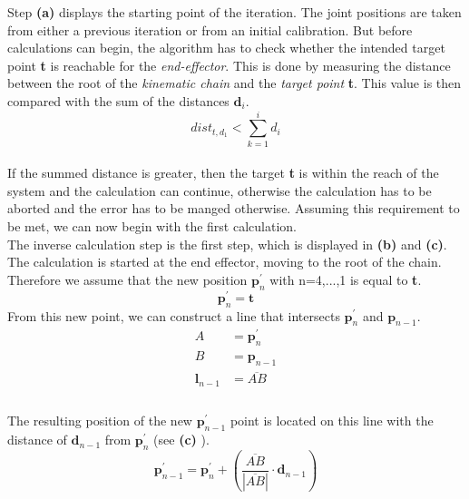 Step \textbf{(a)} displays the starting point of the iteration. The joint positions are taken from either a previous iteration or from an initial calibration. 
But before calculations can begin, the algorithm has to check whether the intended target point \textbf{t} is reachable for the \textit{end-effector}. This is done by measuring the distance between the root of the \textit{kinematic chain} and the \textit{target point} \textbf{t}. This value is then compared with the sum of the distances $\textbf{d}_{i}$.\\
\begin{equation}
 dist_{t,d_{1}}< \sum_{k=1}^{i}{d_{i}}
\end{equation}
\\If the summed distance is greater, then the target \textbf{t} is within the reach of the system and the calculation can continue, otherwise the calculation has to be aborted and the error has to be manged otherwise.
Assuming this requirement to be met, we can now begin with the first calculation. \\The inverse calculation step is the first step, which is displayed in \textbf{(b)} and \textbf{(c)}. The calculation is started at the end effector, moving to the root of the chain.\newpage
Therefore we assume that the new position $\textbf{p}_{n}^{'}$ with n=4,...,1 is equal to \textbf{t}.\\
\begin{equation}
 \textbf{p}_{n}^{'}=\textbf{t}
\end{equation}
From this new point, we can construct a line that intersects $\textbf{p}_{n}^{'}$ and $\textbf{p}_{n-1}$.\\
\begin{equation}
\begin{split}
A&=\textbf{p}_{n}^{'}\\
B&=\textbf{p}_{n-1}\\
\textbf{l}_{n-1}&=\overline{AB}\\
\end{split}
\end{equation}
\\The resulting position of the new $\textbf{p}_{n-1}^{'}$ point is located on this line with the distance of $\textbf{d}_{n-1}$ from $\textbf{p}_{n}^{'}$ (see \textbf{(c)} ).\\
\begin{equation}
\textbf{p}_{n-1}^{'}= \textbf{p}_{n}^{'}+ \left(\frac{\overline{AB}}{|\overline{AB}|}\cdot\textbf{d}_{n-1}\right)
\end{equation}
